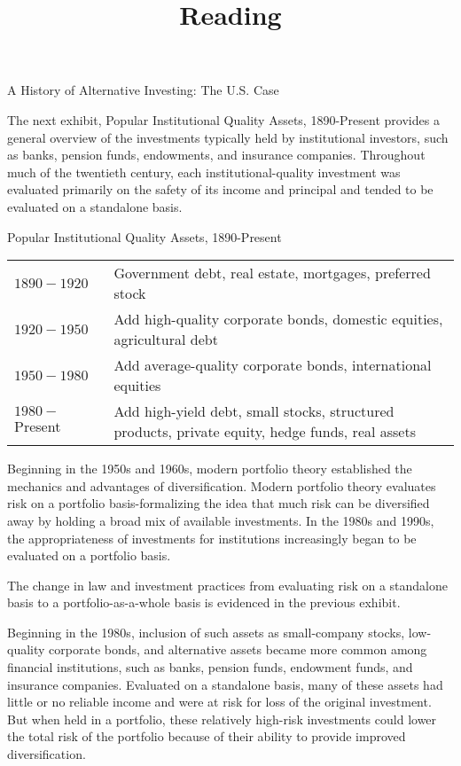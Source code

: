 \documentclass[11pt]{article}
\title{Reading }
\author{}
\date{}
\begin{document}
\maketitle
A History of Alternative Investing: The U.S. Case

The next exhibit, Popular Institutional Quality Assets, 1890-Present provides a general overview of the investments typically held by institutional investors, such as banks, pension funds, endowments, and insurance companies. Throughout much of the twentieth century, each institutional-quality investment was evaluated primarily on the safety of its income and principal and tended to be evaluated on a standalone basis.

Popular Institutional Quality Assets, 1890-Present

\begin{center}
\begin{tabular}{ll|}
\hline
$1890-1920$ & Government debt, real estate, mortgages, preferred stock \\
$1920-1950$ & Add high-quality corporate bonds, domestic equities, agricultural debt \\
$1950-1980$ & Add average-quality corporate bonds, international equities \\
$1980-$ Present & Add high-yield debt, small stocks, structured products, private equity, hedge funds, real assets \\
\end{tabular}
\end{center}

Beginning in the 1950s and 1960s, modern portfolio theory established the mechanics and advantages of diversification. Modern portfolio theory evaluates risk on a portfolio basis-formalizing the idea that much risk can be diversified away by holding a broad mix of available investments. In the 1980s and 1990s, the appropriateness of investments for institutions increasingly began to be evaluated on a portfolio basis.

The change in law and investment practices from evaluating risk on a standalone basis to a portfolio-as-a-whole basis is evidenced in the previous exhibit.

Beginning in the 1980s, inclusion of such assets as small-company stocks, low-quality corporate bonds, and alternative assets became more common among financial institutions, such as banks, pension funds, endowment funds, and insurance companies. Evaluated on a standalone basis, many of these assets had little or no reliable income and were at risk for loss of the original investment. But when held in a portfolio, these relatively high-risk investments could lower the total risk of the portfolio because of their ability to provide improved diversification.
\end{document}
